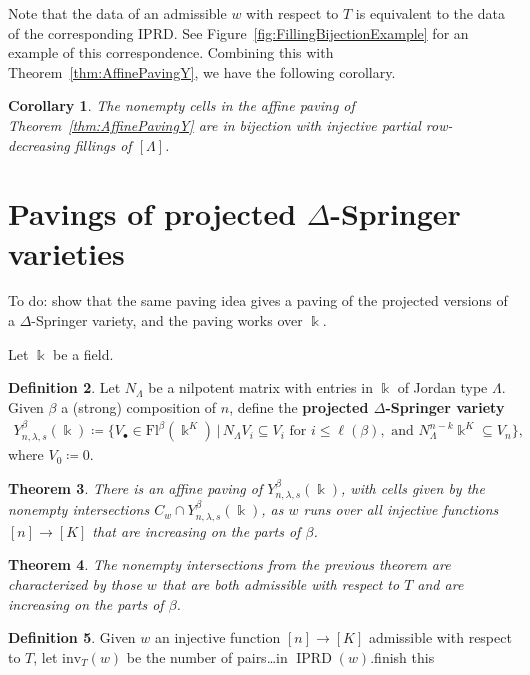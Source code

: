 \documentclass[11pt]{amsart}
\newtheorem{theorem}{Theorem}[section] %
\newtheorem{corollary}[theorem]{Corollary}
\theoremstyle{definition}
\newtheorem{definition}[theorem]{Definition}
\newcommand{\st}{\,|\,}
\newcommand{\Fl}{\mathrm{Fl}}
\newcommand{\la}{\lambda}
\newcommand{\inv}{\mathrm{inv}}
\newcommand{\bk}{\Bbbk}
\DeclareMathOperator{\IPRD}{IPRD}
\newcommand{\SG}[1]{{\color{red}#1}}
\begin{document}
Note that the data of an admissible $w$ with respect to $T$ is equivalent to the data of the corresponding IPRD.  See Figure~\ref{fig:FillingBijectionExample} for an example of this correspondence. Combining this with Theorem~\ref{thm:AffinePavingY}, we have the following corollary.

\begin{corollary}\label{cor:AffinePavingFillings}
The nonempty cells in the affine paving of Theorem~\ref{thm:AffinePavingY} are in bijection with injective partial row-decreasing fillings of $[\Lambda]$.
\end{corollary}




\section{Pavings of projected $\Delta$-Springer varieties}

\SG{To do: show that the same paving idea gives a paving of the projected versions of a $\Delta$-Springer variety, and the paving works over $\bk$.}

Let $\bk$ be a field.

\begin{definition}
Let $N_\Lambda$ be a nilpotent matrix with entries in $\bk$ of Jordan type $\Lambda$. Given $\beta$ a (strong) composition of $n$, define the \textbf{projected $\Delta$-Springer variety}
\begin{align}
    Y_{n,\la,s}^\beta(\bk)\coloneqq \{V_\bullet \in \Fl^{\beta}(\bk^K)\st N_\Lambda V_i\subseteq V_{i}\text{ for }i\leq \ell(\beta),\text{ and }N_\Lambda^{n-k}\bk^K\subseteq V_n\},
\end{align}
where $V_0\coloneqq 0$.
\end{definition}

\begin{theorem}
There is an affine paving of $Y_{n,\la,s}^\beta(\bk)$, with cells given by the nonempty intersections $C_w \cap Y_{n,\la,s}^\beta(\bk)$, as $w$ runs over all injective functions $[n]\to [K]$ that are increasing on the parts of $\beta$.
\end{theorem}

\begin{theorem}
The nonempty intersections from the previous theorem are characterized by those $w$ that are both admissible with respect to $T$ and are increasing on the parts of $\beta$.
\end{theorem}

\begin{definition}
Given $w$ an injective function $[n]\to [K]$ admissible with respect to $T$, let $\inv_T(w)$ be the number of pairs\dots in $\IPRD(w)$.\SG{finish this}
\end{definition}
\end{document}
